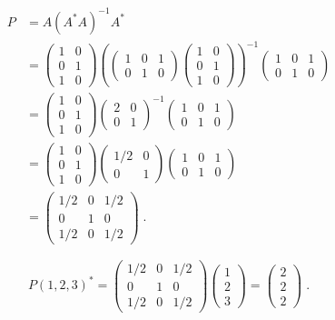 \documentclass[11pt]{article}
\begin{document}
\begin{align*}
P &= A(A^*A)^{-1}A^* \\
&= \begin{pmatrix}
1 & 0 \\ 0 & 1 \\ 1 & 0
\end{pmatrix}\left(\begin{pmatrix} 1&0&1 \\ 0&1&0 \end{pmatrix} \begin{pmatrix}
1 & 0 \\ 0 & 1 \\ 1 & 0
\end{pmatrix}\right)^{-1} \begin{pmatrix} 1&0&1 \\ 0&1&0 \end{pmatrix} \\
&= \begin{pmatrix}
1 & 0 \\ 0 & 1 \\ 1 & 0
\end{pmatrix}
\begin{pmatrix}
2&0 \\  0 & 1
\end{pmatrix}^{-1}
\begin{pmatrix} 1&0&1 \\ 0&1&0 \end{pmatrix} \\
&= \begin{pmatrix}
1 & 0 \\ 0 & 1 \\ 1 & 0
\end{pmatrix}
\begin{pmatrix}
1/2&0 \\  0 & 1
\end{pmatrix}
\begin{pmatrix} 1&0&1 \\ 0&1&0 \end{pmatrix} \\
&= \begin{pmatrix}
1/2 & 0 & 1/2 \\ 0& 1 & 0 \\ 1/2 & 0 & 1/2
\end{pmatrix} \;.
\end{align*}

$$P(1,2,3)^* = \begin{pmatrix}
1/2 & 0 & 1/2 \\ 0& 1 & 0 \\ 1/2 & 0 & 1/2
\end{pmatrix} \begin{pmatrix}
1\\  2 \\ 3
\end{pmatrix} = \begin{pmatrix}
2 \\ 2 \\2 
\end{pmatrix} \;.$$
\end{document}
